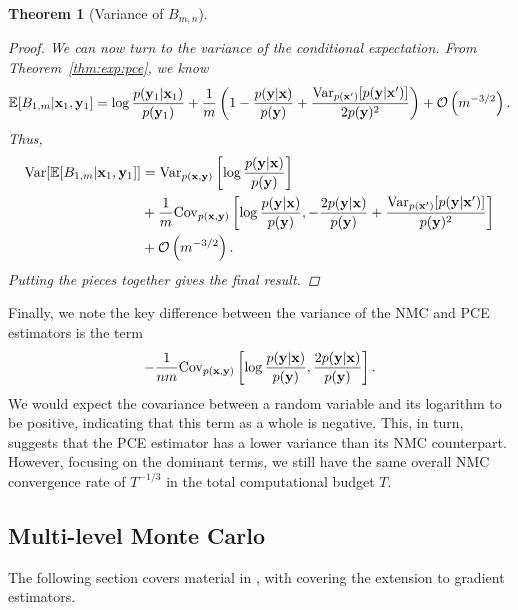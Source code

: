 \documentclass[a4paper, 10pt]{report}
\theoremstyle{plain}
\newtheorem{theorem}{Theorem}[chapter]
\begin{document}
\begin{theorem}[Variance of $B_{m,n}$]
\begin{proof}
			We can now turn to the variance of the conditional expectation.
			From Theorem~\ref{thm:exp:pce}, we know
			\begin{equation}
			\mathbb{E}[B_{1,m}|{\mathbf{x}}_1,{\mathbf{y}}_1] = \log \frac{p({\mathbf{y}}_1|{\mathbf{x}}_1)}{p({\mathbf{y}}_1)} + \frac{1}{m} \left( 1 - \frac{p({\mathbf{y}}|{\mathbf{x}})}{p({\mathbf{y}})} +  \frac{\mathrm{Var}_{p({\mathbf{x}}')}[p({\mathbf{y}}|{\mathbf{x}}')]}{2p({\mathbf{y}})^2} \right)  + \mathcal{O}\left( m^{-3/2} \right).
			\end{equation}
			Thus,
			\begin{equation}
			\begin{split}
			\mathrm{Var}[\mathbb{E}[B_{1,m}|{\mathbf{x}}_1,{\mathbf{y}}_1]] &= \mathrm{Var}_{p({\mathbf{x}},{\mathbf{y}})}\left[ \log\frac{p({\mathbf{y}}|{\mathbf{x}})}{p({\mathbf{y}})} \right] \\
			&+\frac{1}{m}\mathrm{Cov}_{p({\mathbf{x}},{\mathbf{y}})}\left[ \log\frac{p({\mathbf{y}}|{\mathbf{x}})}{p({\mathbf{y}})} ,  - \frac{2p({\mathbf{y}}|{\mathbf{x}})}{p({\mathbf{y}})} + \frac{\mathrm{Var}_{p({\mathbf{x}}')}[p({\mathbf{y}}|{\mathbf{x}}')]}{p({\mathbf{y}})^2}  \right] \\
			&+ \mathcal{O}\left(m^{-3/2}\right).
			\end{split}
			\end{equation}
			Putting the pieces together gives the final result.
		\end{proof}
	\end{theorem}
	Finally, we note the key difference between the variance of the NMC and PCE estimators is the term
	\begin{equation}
	-\frac{1}{nm}\mathrm{Cov}_{p({\mathbf{x}},{\mathbf{y}})}\left[ \log\frac{p({\mathbf{y}}|{\mathbf{x}})}{p({\mathbf{y}})} ,  \frac{2p({\mathbf{y}}|{\mathbf{x}})}{p({\mathbf{y}})}   \right].
	\end{equation}
	We would expect the covariance between a random variable and its logarithm to be positive, indicating that this term as a whole is negative.
	This, in turn, suggests that the PCE estimator has a lower variance than its NMC counterpart.
	However, focusing on the dominant terms, we still have the same overall NMC convergence rate of $T^{-1/3}$ in the total computational budget $T$.
	
	
	\subsection{Multi-level Monte Carlo}
	\label{sec:mlmc}
	The following section covers material in \citet{goda2020multilevel}, with \citet{goda2020unbiased} covering the extension to gradient estimators.
	
\end{document}
